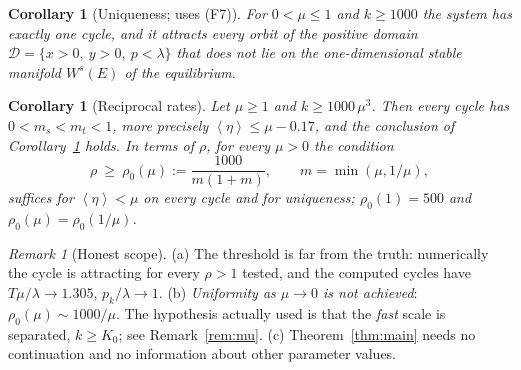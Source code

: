 \documentclass[11pt,a4paper]{article}
\newtheorem{corollary}[theorem]{Corollary}
\theoremstyle{remark}\newtheorem{remark}[theorem]{Remark}
\newcommand{\avg}[1]{\left\langle #1\right\rangle}
\begin{document}
\begin{corollary}[Uniqueness; uses (F7)]\label{cor:unique}
For $0<\mu\le1$ and $k\ge1000$ the system has exactly one cycle, and it attracts every orbit of the
positive domain $\mathcal D=\{x>0,\ y>0,\ p<\lambda\}$ that does not lie on the one-dimensional stable
manifold $W^s(E)$ of the equilibrium.
\end{corollary}

\begin{corollary}[Reciprocal rates]\label{cor:recip}
Let $\mu\ge1$ and $k\ge1000\,\mu^3$. Then every cycle has $0<m_s<m_t<1$, more precisely
$\avg\eta\le\mu-0.17$, and the conclusion of Corollary~\ref{cor:unique} holds. In terms of $\rho$,
for every $\mu>0$ the condition
\[
\rho\ \ge\ \rho_0(\mu):=\frac{1000}{m(1+m)},\qquad m=\min(\mu,1/\mu),
\]
suffices for $\avg\eta<\mu$ on every cycle and for uniqueness; $\rho_0(1)=500$ and
$\rho_0(\mu)=\rho_0(1/\mu)$.
\end{corollary}

\begin{remark}[Honest scope]\label{rem:scope}
(a) The threshold is far from the truth: numerically the cycle is attracting for every $\rho>1$
tested, and the computed cycles have $T\mu/\lambda\to1.305$, $p_k/\lambda\to1$.
(b) \emph{Uniformity as $\mu\to0$ is not achieved}: $\rho_0(\mu)\sim1000/\mu$. The hypothesis actually
used is that the \emph{fast} scale is separated, $k\ge K_0$; see Remark~\ref{rem:mu}.
(c) Theorem~\ref{thm:main} needs no continuation and no information about other parameter values.
\end{remark}
\end{document}
